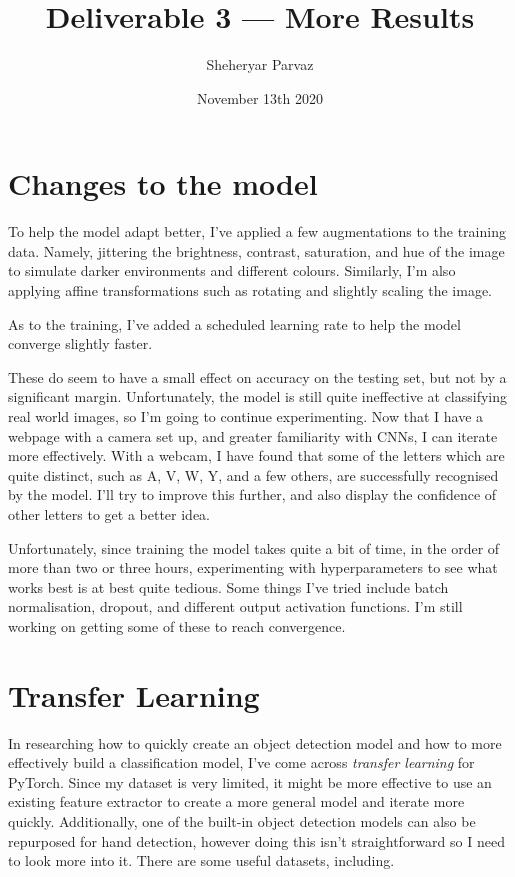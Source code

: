 \documentclass[12pt]{article}
\title{\vspace{-6ex}Deliverable 3 --- More Results}
\author{Sheheryar Parvaz}
\date{November 13th 2020}
\begin{document}
\maketitle


\section{Changes to the model}

To help the model adapt better, I've applied a few augmentations to the
training data. Namely, jittering the brightness, contrast, saturation,
and hue of the image to simulate darker environments and different
colours. Similarly, I'm also applying affine transformations such as
rotating and slightly scaling the image.

As to the training, I've added a scheduled learning rate to help the
model converge slightly faster.

These do seem to have a small effect on accuracy on the testing set, but
not by a significant margin. Unfortunately, the model is still quite
ineffective at classifying real world images, so I'm going to continue
experimenting. Now that I have a webpage with a camera set up, and
greater familiarity with CNNs, I can iterate more effectively. With a
webcam, I have found that some of the letters which are quite distinct,
such as A, V, W, Y, and a few others, are successfully recognised by the
model. I'll try to improve this further, and also display the confidence
of other letters to get a better idea.

Unfortunately, since training the model takes quite a bit of time, in
the order of more than two or three hours, experimenting with
hyperparameters to see what works best is at best quite tedious. Some
things I've tried include batch normalisation, dropout, and different
output activation functions. I'm still working on getting some of these
to reach convergence.

\section{Transfer Learning}

In researching how to quickly create an object detection model and how
to more effectively build a classification model, I've come across
\textit{transfer learning} for PyTorch\cite{finetuning}. Since my
dataset is very limited, it might be more effective to use an existing
feature extractor to create a more general model and iterate more
quickly. Additionally, one of the built-in object detection models can
also be repurposed for hand detection, however doing this isn't
straightforward so I need to look more into it. There are some useful
datasets, including\cite{egohands}.
\end{document}
